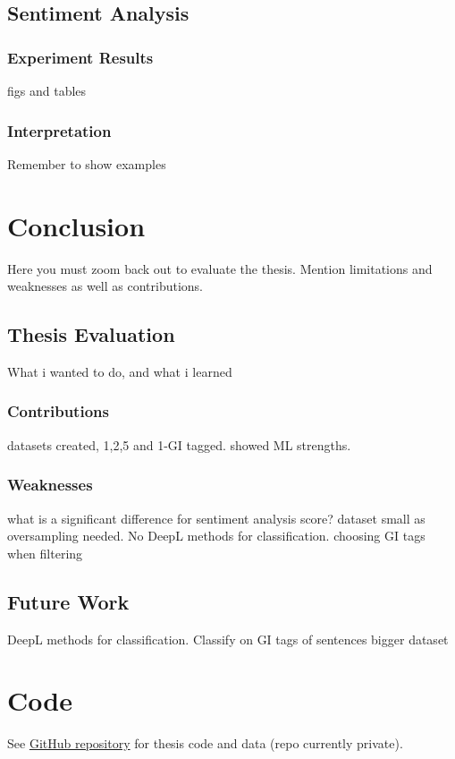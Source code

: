 \documentclass[oneside,12pt]{Classes/RoboticsLaTeX}
\begin{document}
\section{Sentiment Analysis}

\subsection{Experiment Results}
figs and tables


\subsection{Interpretation}
Remember to show examples

\chapter{Conclusion}
\label{chap:conclusion}
Here you must zoom back out to evaluate the thesis. Mention limitations and weaknesses as well as contributions.

\section{Thesis Evaluation}
What i wanted to do, and what i learned
\subsection{Contributions}
datasets created, 1,2,5 and 1-GI tagged. showed ML strengths.  
\subsection{Weaknesses}
what is a significant difference for sentiment analysis score?
dataset small as oversampling needed.
No DeepL methods for classification.
choosing GI tags when filtering
\section{Future Work}
DeepL methods for classification.
Classify on GI tags of sentences
bigger dataset

\renewcommand{\bibname}{References}           %


\appendix
\chapter{Code} 
\label{chap:Code}
See \href{https://github.com/EoghanOGallchoir/Thesis_Code}{GitHub repository} for thesis code and data (repo currently private).
\end{document}
